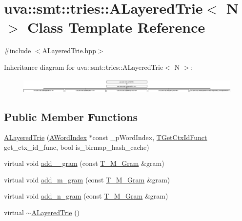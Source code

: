 \hypertarget{classuva_1_1smt_1_1tries_1_1_a_layered_trie}{}\section{uva\+:\+:smt\+:\+:tries\+:\+:A\+Layered\+Trie$<$ N $>$ Class Template Reference}
\label{classuva_1_1smt_1_1tries_1_1_a_layered_trie}


{\ttfamily \#include $<$A\+Layered\+Trie.\+hpp$>$}

Inheritance diagram for uva\+:\+:smt\+:\+:tries\+:\+:A\+Layered\+Trie$<$ N $>$\+:\begin{figure}[H]
\begin{center}
\leavevmode
\includegraphics[height=0.788732cm]{classuva_1_1smt_1_1tries_1_1_a_layered_trie}
\end{center}
\end{figure}
\subsection*{Public Member Functions}
\begin{DoxyCompactItemize}
\item 
\hyperlink{classuva_1_1smt_1_1tries_1_1_a_layered_trie_a27adf0c1d1bf1497d7205f172285b46d}{A\+Layered\+Trie} (\hyperlink{classuva_1_1smt_1_1tries_1_1dictionary_1_1_a_word_index}{A\+Word\+Index} $\ast$const \+\_\+p\+Word\+Index, \hyperlink{namespaceuva_1_1smt_1_1tries_a535548b30b94f85d4b3457a383f8076e}{T\+Get\+Ctx\+Id\+Funct} get\+\_\+ctx\+\_\+id\+\_\+func, bool is\+\_\+birmap\+\_\+hash\+\_\+cache)
\item 
virtual void \hyperlink{classuva_1_1smt_1_1tries_1_1_a_layered_trie_a36a55b5d2d85c9b8de4f8915956df4b5}{add\+\_\+\_\+gram} (const \hyperlink{structuva_1_1smt_1_1tries_1_1mgrams_1_1_t___m___gram}{T\+\_\+\+M\+\_\+\+Gram} \&gram)
\item 
virtual void \hyperlink{classuva_1_1smt_1_1tries_1_1_a_layered_trie_aed865ddfcfddb0f924d7424f9c2dba30}{add\+\_\+m\+\_\+gram} (const \hyperlink{structuva_1_1smt_1_1tries_1_1mgrams_1_1_t___m___gram}{T\+\_\+\+M\+\_\+\+Gram} \&gram)
\item 
virtual void \hyperlink{classuva_1_1smt_1_1tries_1_1_a_layered_trie_a4640ef130893289b79b357bd840d1d49}{add\+\_\+n\+\_\+gram} (const \hyperlink{structuva_1_1smt_1_1tries_1_1mgrams_1_1_t___m___gram}{T\+\_\+\+M\+\_\+\+Gram} \&gram)
\item 
virtual \hyperlink{classuva_1_1smt_1_1tries_1_1_a_layered_trie_a45250096524b684050adafb2395cdfe9}{$\sim$\+A\+Layered\+Trie} ()
\end{DoxyCompactItemize}
